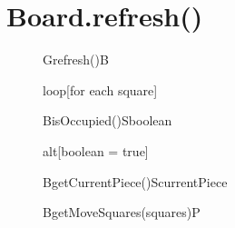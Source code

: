 \documentclass[6pt,landscape]{article}
\begin{document}
\section{Board.refresh()}
\begin{figure}[H]
	\centering
  	\begin{adjustbox}{width=\textwidth}
		\begin{sequencediagram}
			      
			\begin{call}{G}{refresh()}{B}{}	
				\begin{sdblock}{loop}{[for each square]}
					\begin{call}{B}{isOccupied()}{S}{boolean}
					\end{call}
					\begin{sdblock}{alt}{[boolean = true]}
						\begin{call}{B}{getCurrentPiece()}{S}{currentPiece}
						\end{call}
						
				  		\begin{messcall}{B}{getMoveSquares(squares)}{P}
						\end{messcall}
				  		
				  		
				  	\end{sdblock}
	    
	    
				\end{sdblock}	
			\end{call}
		
		
		
		\end{sequencediagram}
	\end{adjustbox}
\end{figure}
\end{document}
